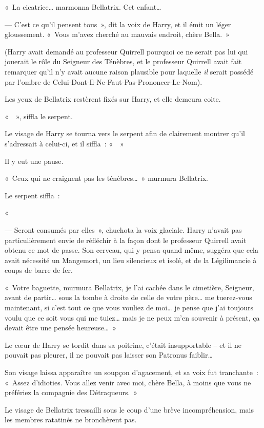 «~La cicatrice… marmonna Bellatrix.
Cet enfant…

--- C'est ce qu'il pensent tous~», dit la voix de Harry, et il émit un léger gloussement.
«~Vous m'avez cherché au mauvais endroit, chère Bella.~»

(Harry avait demandé au professeur Quirrell pourquoi ce ne serait pas lui qui jouerait le rôle du Seigneur des Ténèbres, et le professeur Quirrell avait fait remarquer qu'il n'y avait aucune raison plausible pour laquelle \emph{il} serait possédé par l'ombre de Celui-Dont-Il-Ne-Faut-Pas-Prononcer-Le-Nom).

Les yeux de Bellatrix restèrent fixés sur Harry, et elle demeura coite.

«~~», siffla le serpent.

Le visage de Harry se tourna vers le serpent afin de clairement montrer qu'il s'adressait à celui-ci, et il siffla~: «~~»

Il y eut une pause.

«~Ceux qui ne craignent pas les ténèbres…~»
murmura Bellatrix.

Le serpent siffla~:

«~

--- Seront consumés par elles~», chuchota la voix glaciale.
Harry n'avait pas particulièrement envie de réfléchir à la façon dont le professeur Quirrell avait obtenu ce mot de passe.
Son cerveau, qui y pensa quand même, suggéra que cela avait nécessité un Mangemort, un lieu silencieux et isolé, et de la Légilimancie à coups de barre de fer.

«~Votre baguette, murmura Bellatrix, je l'ai cachée dans le cimetière, Seigneur, avant de partir… sous la tombe à droite de celle de votre père… me tuerez-vous maintenant, si c'est tout ce que vous vouliez de moi… je pense que j'ai toujours voulu que ce soit vous qui me tuiez… mais je ne peux m'en souvenir à présent, ça devait être une pensée heureuse…~»

Le cœur de Harry se tordit dans sa poitrine, c'était insupportable -- et il ne pouvait pas pleurer, il ne pouvait pas laisser son Patronus faiblir…

Son visage laissa apparaître un soupçon d'agacement, et sa voix fut tranchante~: «~Assez d'idioties.
Vous allez venir avec moi, chère Bella, à moins que vous ne préfériez la compagnie des Détraqueurs.~»

Le visage de Bellatrix tressailli sous le coup d'une brève incompréhension, mais les membres ratatinés ne bronchèrent pas.

